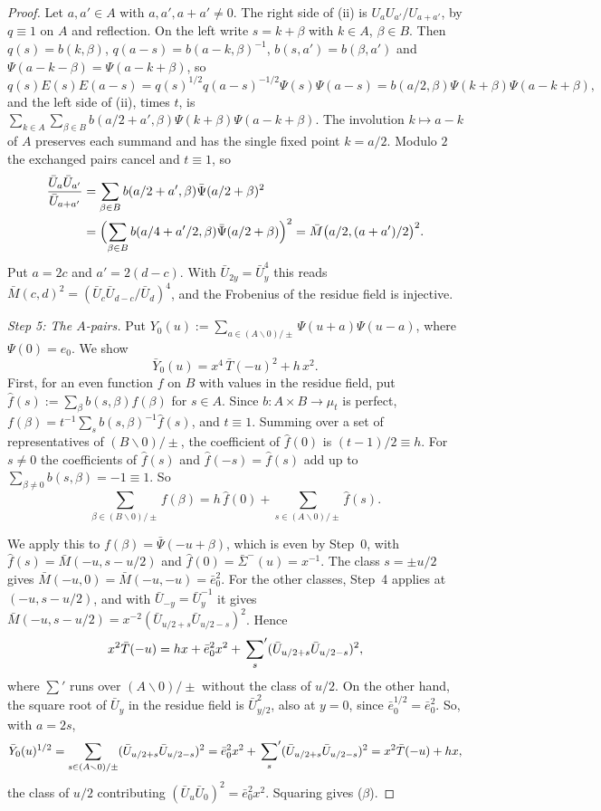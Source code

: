 \documentclass[11pt]{amsart}
\numberwithin{equation}{section}
\theoremstyle{plain}
\theoremstyle{definition}
\theoremstyle{remark}
\begin{document}
\begin{proof}
Let \(a,a'\in A\) with \(a,a',a+a'\ne0\). The right side of (ii) is \(U_aU_{a'}/U_{a+a'}\), by \(q\equiv1\) on \(A\) and reflection. On the left write \(s=k+\beta\) with \(k\in A\), \(\beta\in B\). Then \(q(s)=b(k,\beta)\), \(q(a-s)=b(a-k,\beta)^{-1}\), \(b(s,a')=b(\beta,a')\) and \(\Psi(a-k-\beta)=\Psi(a-k+\beta)\), so
\[q(s)E(s)E(a-s)=q(s)^{1/2}q(a-s)^{-1/2}\Psi(s)\Psi(a-s)=b(a/2,\beta)\Psi(k+\beta)\Psi(a-k+\beta),\]
and the left side of (ii), times \(t\), is \(\sum_{k\in A}\sum_{\beta\in B}b(a/2+a',\beta)\Psi(k+\beta)\Psi(a-k+\beta)\). The involution \(k\mapsto a-k\) of \(A\) preserves each summand and has the single fixed point \(k=a/2\). Modulo \(2\) the exchanged pairs cancel and \(t\equiv1\), so
\begin{align*}
\frac{\bar U_a\bar U_{a'}}{\bar U_{a+a'}}&=\sum_{\beta\in B}b(a/2+a',\beta)\bar\Psi(a/2+\beta)^2\\
&=\Bigl(\sum_{\beta\in B}b(a/4+a'/2,\beta)\bar\Psi(a/2+\beta)\Bigr)^2=\bar M\bigl(a/2,(a+a')/2\bigr)^2 .
\end{align*}
Put \(a=2c\) and \(a'=2(d-c)\). With \(\bar U_{2y}=\bar U_y^4\) this reads \(\bar M(c,d)^2=(\bar U_c\bar U_{d-c}/\bar U_d)^4\), and the Frobenius of the residue field is injective.

\emph{Step 5: The \(A\)-pairs.} Put \(Y_0(u):=\sum_{a\in(A\smallsetminus0)/\pm}\Psi(u+a)\Psi(u-a)\), where \(\Psi(0)=e_0\). We show
\[\bar Y_0(u)=x^4\,\bar T(-u)^2+h\,x^2 .\tag{\(\beta\)}\]
First, for an even function \(f\) on \(B\) with values in the residue field, put \(\hat f(s):=\sum_\beta b(s,\beta)f(\beta)\) for \(s\in A\). Since \(b:A\times B\to\mu_t\) is perfect, \(f(\beta)=t^{-1}\sum_sb(s,\beta)^{-1}\hat f(s)\), and \(t\equiv1\). Summing over a set of representatives of \((B\smallsetminus0)/\pm\), the coefficient of \(\hat f(0)\) is \((t-1)/2\equiv h\). For \(s\ne0\) the coefficients of \(\hat f(s)\) and \(\hat f(-s)=\hat f(s)\) add up to \(\sum_{\beta\ne0}b(s,\beta)=-1\equiv1\). So
\[\sum_{\beta\in(B\smallsetminus0)/\pm}f(\beta)=h\,\hat f(0)+\sum_{s\in(A\smallsetminus0)/\pm}\hat f(s).\]

We apply this to \(f(\beta)=\bar\Psi(-u+\beta)\), which is even by Step~0, with \(\hat f(s)=\bar M(-u,s-u/2)\) and \(\hat f(0)=\bar\Sigma^-(u)=x^{-1}\). The class \(s=\pm u/2\) gives \(\bar M(-u,0)=\bar M(-u,-u)=\bar e_0^2\). For the other classes, Step~4 applies at \((-u,s-u/2)\), and with \(\bar U_{-y}=\bar U_y^{-1}\) it gives \(\bar M(-u,s-u/2)=x^{-2}(\bar U_{u/2+s}\bar U_{u/2-s})^2\). Hence
\[x^2\bar T(-u)=hx+\bar e_0^2x^2+\sideset{}{'}\sum_s(\bar U_{u/2+s}\bar U_{u/2-s})^2,\]
where \(\sum'\) runs over \((A\smallsetminus0)/\pm\) without the class of \(u/2\). On the other hand, the square root of \(\bar U_y\) in the residue field is \(\bar U_{y/2}^2\), also at \(y=0\), since \(\bar e_0^{1/2}=\bar e_0^2\). So, with \(a=2s\),
\[\bar Y_0(u)^{1/2}=\sum_{s\in(A\smallsetminus0)/\pm}(\bar U_{u/2+s}\bar U_{u/2-s})^2=\bar e_0^2x^2+\sideset{}{'}\sum_s(\bar U_{u/2+s}\bar U_{u/2-s})^2=x^2\bar T(-u)+hx,\]
the class of \(u/2\) contributing \((\bar U_u\bar U_0)^2=\bar e_0^2x^2\). Squaring gives (\(\beta\)).


\end{proof}
\end{document}

